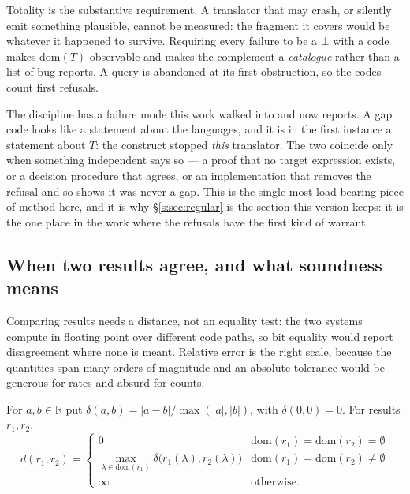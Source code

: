 \noindent
Totality is the substantive requirement. A translator that may crash, or silently emit
something plausible, cannot be measured: the fragment it covers would be whatever it
happened to survive. Requiring every failure to be a $\bot$ with a code makes
$\mathrm{dom}(T)$ observable and makes the complement a \emph{catalogue} rather than a
list of bug reports. A query is abandoned at its first obstruction, so the codes count
first refusals.

\begin{remark}\label{s:rem:refusal}
The discipline has a failure mode this work walked into and now reports. A gap code looks
like a statement about the languages, and it is in the first instance a statement about
$T$: the construct stopped \emph{this} translator. The two coincide only when something
independent says so --- a proof that no target expression exists, or a decision procedure
that agrees, or an implementation that removes the refusal and so shows it was never a
gap. This is the single most load-bearing piece of method here, and it is why
\S\ref{s:sec:regular} is the section this version keeps: it is the one place in the work
where the refusals have the first kind of warrant.
\end{remark}

\subsection{When two results agree, and what soundness means}

Comparing results needs a distance, not an equality test: the two systems compute in
floating point over different code paths, so bit equality would report disagreement where
none is meant. Relative error is the right scale, because the quantities span many orders
of magnitude and an absolute tolerance would be generous for rates and absurd for counts.

\begin{definition}\label{s:def:d}
For $a,b\in\mathbb{R}$ put $\delta(a,b)=|a-b|/\max(|a|,|b|)$, with $\delta(0,0)=0$. For
results $r_1,r_2$,
\[
d(r_1,r_2)=\begin{cases}
0 & \mathrm{dom}(r_1)=\mathrm{dom}(r_2)=\emptyset\\
\max_{\lambda\in\mathrm{dom}(r_1)}\delta\big(r_1(\lambda),r_2(\lambda)\big)
  & \mathrm{dom}(r_1)=\mathrm{dom}(r_2)\neq\emptyset\\
\infty & \text{otherwise.}
\end{cases}
\]
\end{definition}

